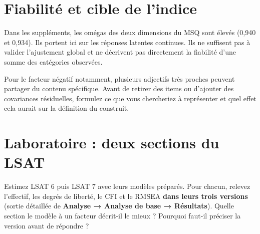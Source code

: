 \documentclass[
  french,
  11pt,
  a4paper,
  DIV=11,
  numbers=noendperiod]{scrreprt}
\begin{document}
\section{Fiabilité et cible de
l'indice}\label{fiabilituxe9-et-cible-de-lindice}

Dans les suppléments, les omégas des deux dimensions du MSQ sont élevés
(0,940 et 0,934). Ils portent ici sur les réponses latentes continues.
Ils ne suffisent pas à valider l'ajustement global et ne décrivent pas
directement la fiabilité d'une somme des catégories observées.

Pour le facteur négatif notamment, plusieurs adjectifs très proches
peuvent partager du contenu spécifique. Avant de retirer des items ou
d'ajouter des covariances résiduelles, formulez ce que vous chercheriez
à représenter et quel effet cela aurait sur la définition du construit.

\section{Laboratoire : deux sections du
LSAT}\label{laboratoire-deux-sections-du-lsat}

Estimez LSAT 6 puis LSAT 7 avec leurs modèles préparés. Pour chacun,
relevez l'effectif, les degrés de liberté, le CFI et le RMSEA
\textbf{dans leurs trois versions} (sortie détaillée de \textbf{Analyse
→ Analyse de base → Résultats}). Quelle section le modèle à un facteur
décrit-il le mieux ? Pourquoi faut-il préciser la version avant de
répondre ?
\end{document}
